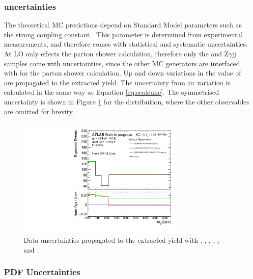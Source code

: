 \subsubsection{\alphas uncertainties}

The theoretical MC precictions depend on Standard Model parameters such as the strong coupling constant \alphas. This parameter is determined from experimental measurements, and therefore comes with statistical and systematic uncertainties. At LO \alphas only effects the parton shower calculation, therefore only the \SHERPA \qcdwy and Z$\gamma$jj samples come with \alphas uncertainties, since the other MC generators are interfaced with \PYTHIA for the parton shower calculation. Up and down variations in the value of \alphas are propagated to the extracted \ewwy yield. The uncertainty from an \alphas variation is calculated in the same way as Equation \ref{eq:scaleunc}. The symmetrised uncertainty is shown in Figure \ref{fig:vbswy:alphas} for the \mjj distribution, where the other observables are omitted for brevity.

\begin{figure}[t]
  \centering
  \includegraphics[width=0.75\textwidth]{plots/diffx/alphas/data/mjj_QCD_Sh2211_THEORY_3cr_alpha_s_0p01sigma_allvariations.pdf}
  \caption{Data \alphas uncertainties propagated to the extracted \ewwy yield with \mjj, \ptjj, \dphisigned, \mly, \leppt, and \lepgamdphi.\label{fig:vbswy:alphas}}
\end{figure}

\subsubsection{PDF Uncertainties}


